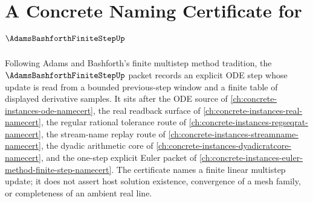 \chapter{A Concrete Naming Certificate for $\AdamsBashforthFiniteStepUp$}
\label{ch:concrete-instances-adams-bashforth-finite-step-namecert}

Following Adams and Bashforth's finite multistep method tradition, the $\AdamsBashforthFiniteStepUp$ packet records an explicit ODE step whose update is read from a bounded previous-step window and a finite table of displayed derivative samples. It sits after the ODE source of \autoref{ch:concrete-instances-ode-namecert}, the real readback surface of \autoref{ch:concrete-instances-real-namecert}, the regular rational tolerance route of \autoref{ch:concrete-instances-regseqrat-namecert}, the stream-name replay route of \autoref{ch:concrete-instances-streamname-namecert}, the dyadic arithmetic core of \autoref{ch:concrete-instances-dyadicratcore-namecert}, and the one-step explicit Euler packet of \autoref{ch:concrete-instances-euler-method-finite-step-namecert}. The certificate names a finite linear multistep update; it does not assert host solution existence, convergence of a mesh family, or completeness of an ambient real line.

